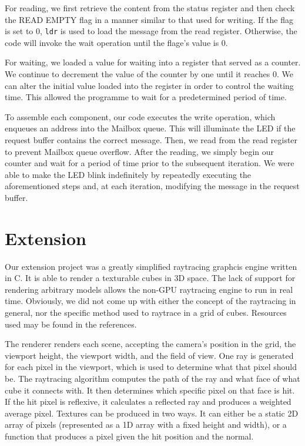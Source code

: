 \documentclass[11pt]{article}
\begin{document}
For reading, we first retrieve the content from the status register and then check the READ EMPTY flag in a manner similar to that used for writing. If the flag is set to 0, \verb|ldr| is used to load the message from the read register. Otherwise, the code will invoke the wait operation until the flage's value is 0.

For waiting, we loaded a value for waiting into a register that served as a counter. We continue to decrement the value of the counter by one until it reaches 0. We can alter the initial value loaded into the register in order to control the waiting time. This allowed the programme to wait for a predetermined period of time.

To assemble each component, our code executes the write operation, which enqueues an address into the Mailbox queue. This will illuminate the LED if the request buffer contains the correct message. Then, we read from the read register to prevent Mailbox queue overflow. After the reading, we simply begin our counter and wait for a period of time prior to the subsequent iteration. We were able to make the LED blink indefinitely by repeatedly executing the aforementioned steps and, at each iteration, modifying the message in the request buffer.

\section{Extension}

Our extension project was a greatly simplified raytracing graphcis engine written in C. It is able to render a texturable cubes in 3D space. The lack of support for rendering arbitrary models allows the non-GPU raytracing engine to run in real time. Obviously, we did not come up with either the concept of the raytracing in general, nor the specific method used to raytrace in a grid of cubes. Resources used may be found in the references.

The renderer renders each scene, accepting the camera's position in the grid, the viewport height, the viewport width, and the field of view. One ray is generated for each pixel in the viewport, which is used to determine what that pixel should be. The raytracing algorithm computes the path of the ray and what face of what cube it connects with. It then determines which specific pixel on that face is hit. If the hit pixel is reflexive, it calculates a reflected ray and produces a weighted average pixel. Textures can be produced in two ways. It can either be a static 2D array of pixels (represented as a 1D array with a fixed height and width), or a function that produces a pixel given the hit position and the normal.
\end{document}
